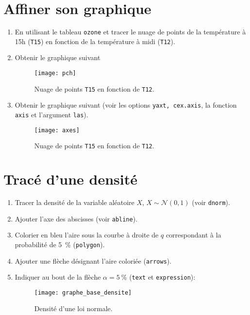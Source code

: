 \documentclass[a4paper,10pt,french]{article}
\newcommand{\fct}[1]{\texttt{#1}}
\newcommand{\code}[1]{\texttt{#1}}
\begin{document}
\section{Affiner son graphique}
\begin{enumerate}
\item En utilisant le tableau \code{ozone} et tracer le nuage de points de la temp\'erature \`a 15h (\code{T15}) en
  fonction de la temp\'erature \`a midi (\code{T12}).
\item Obtenir le graphique suivant 
  \begin{figure}[H]
    \centering
    \texttt{[image: pch]}
    \caption{Nuage de points \code{T15} en
  fonction de \code{T12}.}
  \end{figure}
\item Obtenir le graphique suivant (voir les options \texttt{yaxt, cex.axis},  la fonction \texttt{axis} et l'argument \texttt{las}). 
  \begin{figure}[H]
    \centering
    \texttt{[image: axes]}
    \caption{Nuage de points \code{T15} en
  fonction de \code{T12}.}
 \end{figure}
\end{enumerate}


\section{Trac\'e d'une densit\'e}
\begin{enumerate}
\item Tracer la densit\'e de la variable al\'eatoire $X$, $X\sim\mathcal{N}(0,1)$ (voir \code{\fct{dnorm}}).
\item Ajouter l'axe des abscisses (voir \code{\fct{abline}}).
\item Colorier en bleu l'aire sous la courbe \`a droite de $q$ correspondant \`a la probabilit\'e de 5~\% (\code{\fct{polygon}}).
\item Ajouter une fl\`eche d\'esignant l'aire colori\'ee (\code{\fct{arrows}}).
\item Indiquer au bout de la fl\`eche $\alpha=5~\%$ (\code{\fct{text}} et \code{\fct{expression}}):
  \begin{figure}[H]
    \centering
    \texttt{[image: graphe\_base\_densite]}
    \caption{Densit\'e d'une loi normale.}
    \label{fig:exdensite}
  \end{figure}
\end{enumerate}
\end{document}

